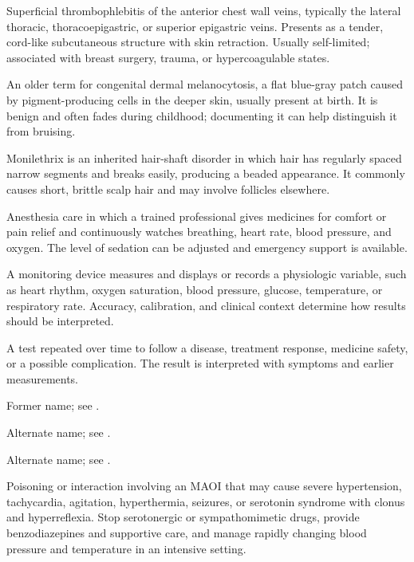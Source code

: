  Superficial thrombophlebitis of the anterior chest wall veins, typically the lateral
thoracic, thoracoepigastric, or superior epigastric veins. Presents as a tender,
cord-like subcutaneous structure with skin retraction. Usually self-limited; associated
with breast surgery, trauma, or hypercoagulable states.

 An older term for congenital dermal melanocytosis, a flat blue-gray patch caused by pigment-producing cells in the deeper skin, usually present at birth. It is benign and often fades during childhood; documenting it can help distinguish it from bruising.

 Monilethrix is an inherited hair-shaft disorder in which hair has regularly spaced narrow segments and breaks easily, producing a beaded appearance. It commonly causes short, brittle scalp hair and may involve follicles elsewhere.

 Anesthesia care in which a trained professional gives medicines for comfort or pain relief and continuously watches breathing, heart rate, blood pressure, and oxygen. The level of sedation can be adjusted and emergency support is available.

 A monitoring device measures and displays or records a physiologic variable, such as heart rhythm, oxygen saturation, blood pressure, glucose, temperature, or respiratory rate. Accuracy, calibration, and clinical context determine how results should be interpreted.

 A test repeated over time to follow a disease, treatment response, medicine safety, or a possible complication. The result is interpreted with symptoms and earlier measurements.

 Former name; see .

 Alternate name; see .

 Alternate name; see .

 Poisoning or interaction involving an MAOI that may cause severe hypertension, tachycardia, agitation, hyperthermia, seizures, or serotonin syndrome with clonus and hyperreflexia. Stop serotonergic or sympathomimetic drugs, provide benzodiazepines and supportive care, and manage rapidly changing blood pressure and temperature in an intensive setting.

